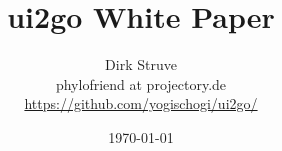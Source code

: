 \begin{titlepage}

\title{ui2go White Paper}

\author{Dirk Struve\\
phylofriend at projectory.de\\
\href{https://github.com/yogischogi/ui2go/}{https://github.com/yogischogi/ui2go/}}
\date{\today}
\end{titlepage}
\maketitle

